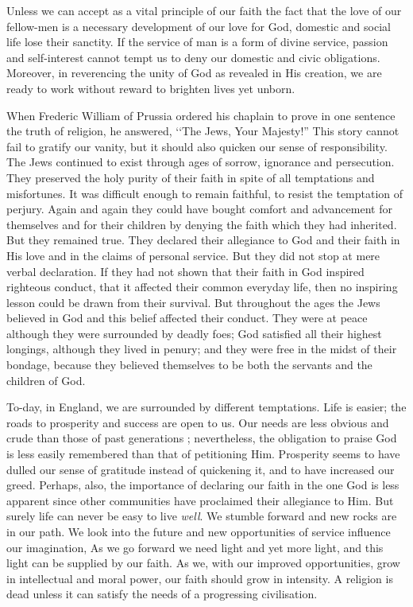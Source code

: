 Unless we can accept as a vital principle
of our faith the fact that the love of our
fellow-men is a necessary development of
our love for God, domestic and social
life lose their sanctity. If the service
of man is a form of divine service,
passion and self-interest cannot tempt us
to deny our domestic and civic obligations.
Moreover, in reverencing the unity of God
as revealed in His creation, we are ready
to work without reward to brighten lives
yet unborn.

When Frederic William of Prussia ordered
his chaplain to prove in one sentence the
truth of religion, he answered, ‘‘The Jews,
Your Majesty!” This story cannot fail to
gratify our vanity, but it should also quicken
our sense of responsibility. The Jews continued
to exist through ages of sorrow,
ignorance and persecution. They preserved
the holy purity of their faith in spite of all
temptations and misfortunes. It was difficult
enough to remain faithful, to resist the
temptation of perjury. Again and again
they could have bought comfort and advancement
for themselves and for their
children by denying the faith which they
had inherited. But they remained true.
They declared their allegiance to God and
their faith in His love and in the claims of
personal service. But they did not stop at
mere verbal declaration. If they had not
shown that their faith in God inspired
righteous conduct, that it affected their
common everyday life, then no inspiring
lesson could be drawn from their survival.
But throughout the ages the Jews believed
in God and this belief affected their conduct.
They were at peace although they were
surrounded by deadly foes; God satisfied all
their highest longings, although they lived
in penury; and they were free in the midst
of their bondage, because they believed
themselves to be both the servants and the
children of God.

To-day, in England, we are surrounded by
different temptations. Life is easier; the
roads to prosperity and success are open to
us. Our needs are less obvious and crude
than those of past generations ; nevertheless,
the obligation to praise God is less easily
remembered than that of petitioning Him.
Prosperity seems to have dulled our sense of
gratitude instead of quickening it, and to
have increased our greed. Perhaps, also,
the importance of declaring our faith in the
one God is less apparent since other
communities have proclaimed their allegiance to
Him. But surely life can never be easy to
live \textsl{well}. We stumble forward and new
rocks are in our path. We look into the
future and new opportunities of service
influence our imagination, As we go forward
we need light and yet more light, and this
light can be supplied by our faith. As we,
with our improved opportunities, grow in
intellectual and moral power, our faith
should grow in intensity. A religion is
dead unless it can satisfy the needs of a
progressing civilisation.

